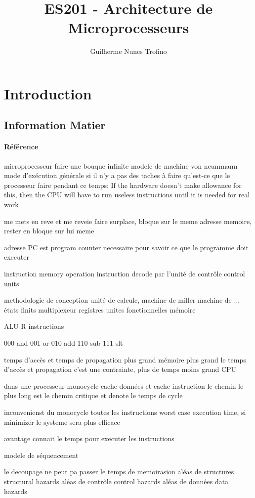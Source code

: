 \documentclass{article}
\title{ES201 - Architecture de Microprocesseurs}
\author{Guilherme Nunes Trofino}
\begin{document}
\maketitle
\setlength{\parindent}{0pt}

\newpage\tableofcontents

\section{Introduction}
% 
% 

% 

\subsection{Information Matier}
\paragraph{Référence}


microprocesseur faire une bouque infinite
modele de machine von neummann
mode d'exécution générale
si il n'y a pas des taches à faire qu'est-ce que le processeur faire pendant ce temps: If the hardware doesn't make allowance for this, then the CPU will have to run useless instructions until it is needed for real work

me mets en reve et me reveie 
faire surplace, bloque sur le meme adresse memoire, rester en bloque sur lui meme

adresse PC est program counter necessaire pour savoir ce que le programme doit executer

instruction memory
operation instruction decode par l'unité de contrôle control units


methodologie de conception
unité de calcule, machine de miller machine de ... états finits
multiplexeur
registres
unites fonctionnelles
mémoire

ALU
R instructions

000 and
001 or
010 add
110 sub
111 slt


temps d'accès et temps de propagation
plus grand mémoire plus grand le temps d'accès et propagation c'est une contrainte, plus de temps moins grand CPU


dans une processeur monocycle
cache données et cache instruction
le chemin le plus long est le chemin critique et denote le temps de cycle

inconvenienst du monocycle
toutes les instructions
worst case execution time, si minimizer le systeme sera plus efficace

avantage
connait le temps pour executer les instructions


modele de séquencement


le decoupage ne peut pa passer le temps de memoirasion
aléas de structures structural hazards
aléas de contrôle control hazards
aléas de données data hazards
\end{document}
